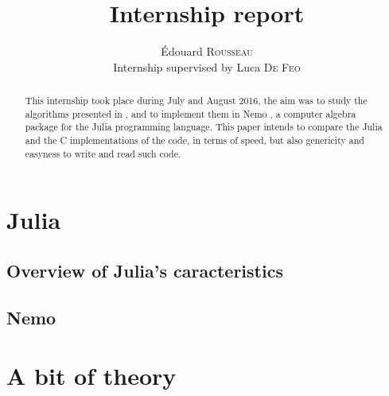 \documentclass[a4paper,11pt]{article}
\title{Internship report}
\author{Édouard \textsc{Rousseau}\\Internship supervised by Luca \textsc{De Feo}}
\theoremstyle{break}
\theoremstyle{definition}
\theoremstyle{remark}
\begin{document}
\maketitle

\begin{abstract}

  This internship took place during July and August 2016, the aim was to study the algorithms presented in \cite{DDS14}, and to implement them in Nemo \cite{Nemo}, a computer algebra package for the Julia \cite{Julia} programming language. This paper intends to compare the Julia and the C implementations of the code, in terms of speed, but also genericity and easyness to write and read such code.

\end{abstract}

\tableofcontents

\clearpage

\section{Julia}
\subsection{Overview of Julia's caracteristics}
\subsection{Nemo}

\section{A bit of theory}
\end{document}
